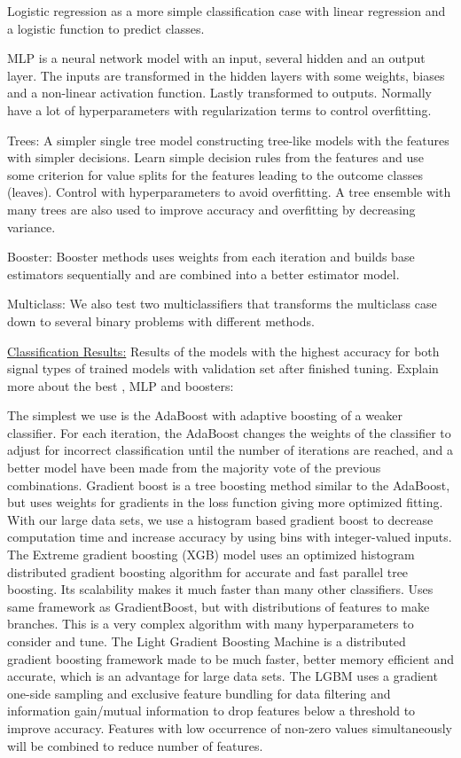 \documentclass[a4paper, american, 12pt]{report}
\begin{document}
	Logistic regression as a more simple classification case with linear regression and a logistic function to predict classes.
	
	MLP is a neural network model with an input, several hidden and an output layer. The inputs are transformed in the hidden layers with some weights, biases and a non-linear activation function. Lastly transformed to outputs. Normally have a lot of hyperparameters with regularization terms to control overfitting.
	
	Trees: A simpler single tree model constructing tree-like models with the features with simpler decisions. Learn simple decision rules from the features and use some criterion for value splits for the features leading to the outcome classes (leaves). Control with hyperparameters to avoid overfitting. A tree ensemble with many trees are also used to improve accuracy and overfitting by decreasing variance.
	
	Booster: Booster methods uses weights from each iteration and builds base estimators sequentially and are combined into a better estimator model. 
	
	Multiclass: We also test two multiclassifiers that transforms the multiclass case down to several binary problems with different methods. 
	
	
	\underline{Classification Results:}
	Results of the models with the highest accuracy for both signal types of trained models with validation set after finished tuning. Explain more about the best , MLP and boosters:
	
	The simplest we use is the AdaBoost with adaptive boosting of a weaker classifier. For each iteration, the AdaBoost changes the weights of the classifier to adjust for incorrect classification until the number of iterations are reached, and a better model have been made from the majority vote of the previous combinations. Gradient boost is a tree boosting method similar to the AdaBoost, but uses weights for gradients in the loss function giving more optimized fitting. With our large data sets, we use a histogram based gradient boost to decrease computation time and increase accuracy by using bins with integer-valued inputs. The Extreme gradient boosting (XGB) model uses an optimized histogram distributed gradient boosting algorithm for accurate and fast parallel tree boosting. Its scalability makes it much faster than many other classifiers. Uses same framework as GradientBoost, but with distributions of features to make branches. This is a very complex algorithm with many hyperparameters to consider and tune. The Light Gradient Boosting Machine is a distributed gradient boosting framework made to be much faster, better memory efficient and accurate, which is an advantage for large data sets. The LGBM uses a gradient one-side sampling and exclusive feature bundling for data filtering and information gain/mutual information to drop features below a threshold to improve accuracy. Features with low occurrence of non-zero values simultaneously will be combined to reduce number of features.
	
\end{document}
